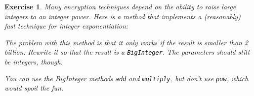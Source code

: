 \documentclass[12pt]{book}
\theoremstyle{exercise}
\newtheorem{exercise}{Exercise}[chapter]
\newcommand{\java}[1]{\lstinline{#1}} %
\begin{document}
\begin{exercise}
Many encryption techniques depend on the ability to raise large integers to an integer power.
Here is a method that implements a (reasonably) fast technique for integer exponentiation:


The problem with this method is that it only works if the result is smaller than 2 billion.
Rewrite it so that the result is a \java{BigInteger}.
The parameters should still be integers, though.

You can use the BigInteger methods \java{add} and \java{multiply}, but don't use \java{pow}, which would spoil the fun.
\end{exercise}
\end{document}

